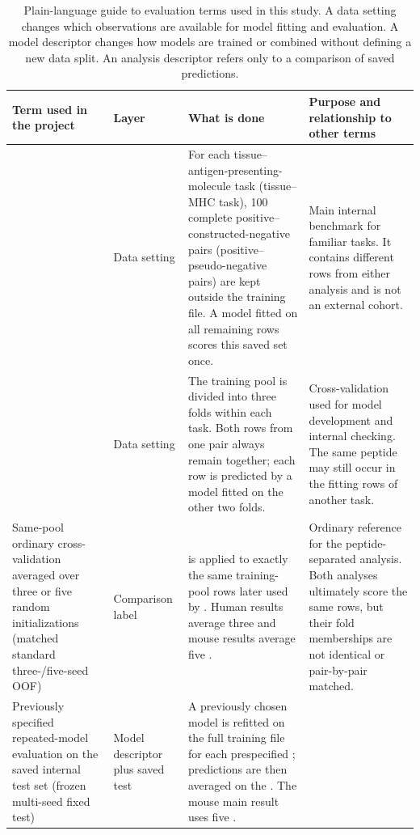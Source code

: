 \begin{table}[tbp]
\centering
\caption{Plain-language guide to evaluation terms used in this study. A data setting changes which observations are available for model fitting and evaluation. A model descriptor changes how models are trained or combined without defining a new data split. An analysis descriptor refers only to a comparison of saved predictions.}
\label{tab:evaluation-protocols}
\scriptsize
\setlength{\tabcolsep}{2pt}
\begin{tabular}{@{}>{\raggedright\arraybackslash}p{2.55cm}
                    >{\raggedright\arraybackslash}p{1.45cm}
                    >{\raggedright\arraybackslash}p{4.05cm}
                    >{\raggedright\arraybackslash}p{3.35cm}@{}}
\toprule
Term used in the project & Layer & What is done & Purpose and relationship to other terms \\
\midrule
\plainFixedTest{}
& Data setting
& For each tissue--antigen-presenting-molecule task (tissue--MHC task), 100 complete positive--constructed-negative pairs (positive--pseudo-negative pairs) are kept outside the training file. A model fitted on all remaining rows scores this saved set once.
& Main internal benchmark for familiar tasks. It contains different rows from either \plainOOF{} analysis and is not an external cohort. \\
\addlinespace
\plainPairOOF{}
& Data setting
& The training pool is divided into three folds within each task. Both rows from one pair always remain together; each row is predicted by a model fitted on the other two folds.
& Cross-validation used for model development and internal checking. The same peptide may still occur in the fitting rows of another task. \\
\addlinespace
Same-pool ordinary cross-validation averaged over three or five random initializations (matched standard three-/five-seed OOF)
& Comparison label
& \plainPairOOF{} is applied to exactly the same training-pool rows later used by \plainPeptideOOF{}. Human results average three \plainSeeds{} and mouse results average five \plainSeeds{}.
& Ordinary reference for the peptide-separated analysis. Both \plainOOF{} analyses ultimately score the same rows, but their fold memberships are not identical or pair-by-pair matched. \\
\addlinespace
Previously specified repeated-model evaluation on the saved internal test set (frozen multi-seed fixed test)
& Model descriptor plus saved test
& A previously chosen model is refitted on the full training file for each prespecified \plainSeed{}; predictions are then averaged on the \plainFixedTest{}. The mouse main result uses five \plainSeeds{}.

\end{tabular}
\end{table}
